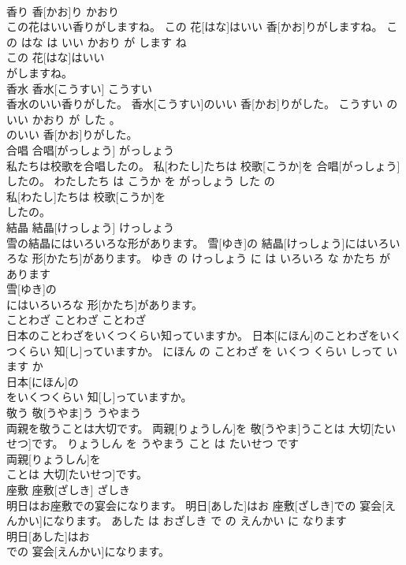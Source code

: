 \documentclass[8pt]{extreport}
\begin{document}
\begin{CJK}{UTF8}{min}
\\	香り	香[かお]り	かおり	
\\	この花はいい香りがしますね。	この 花[はな]はいい 香[かお]りがしますね。	この はな は いい かおり が します ね	
\\	この 花[はな]はいい
\\	がしますね。			
\\	香水	香水[こうすい]	こうすい	
\\	香水のいい香りがした。	香水[こうすい]のいい 香[かお]りがした。	こうすい の いい かおり が した 。	
\\	のいい 香[かお]りがした。			
\\	合唱	合唱[がっしょう]	がっしょう	
\\	私たちは校歌を合唱したの。	私[わたし]たちは 校歌[こうか]を 合唱[がっしょう]したの。	わたしたち は こうか を がっしょう した の	
\\	私[わたし]たちは 校歌[こうか]を
\\	したの。			
\\	結晶	結晶[けっしょう]	けっしょう	
\\	雪の結晶にはいろいろな形があります。	雪[ゆき]の 結晶[けっしょう]にはいろいろな 形[かたち]があります。	ゆき の けっしょう に は いろいろ な かたち が あります	
\\	雪[ゆき]の
\\	にはいろいろな 形[かたち]があります。			
\\	ことわざ	ことわざ	ことわざ	
\\	日本のことわざをいくつくらい知っていますか。	日本[にほん]のことわざをいくつくらい 知[し]っていますか。	にほん の ことわざ を いくつ くらい しって います か	
\\	日本[にほん]の
\\	をいくつくらい 知[し]っていますか。			
\\	敬う	敬[うやま]う	うやまう	
\\	両親を敬うことは大切です。	両親[りょうしん]を 敬[うやま]うことは 大切[たいせつ]です。	りょうしん を うやまう こと は たいせつ です	
\\	両親[りょうしん]を
\\	ことは 大切[たいせつ]です。			
\\	座敷	座敷[ざしき]	ざしき	
\\	明日はお座敷での宴会になります。	明日[あした]はお 座敷[ざしき]での 宴会[えんかい]になります。	あした は おざしき で の えんかい に なります	
\\	明日[あした]はお
\\	での 宴会[えんかい]になります。			

\end{CJK}
\end{document}
